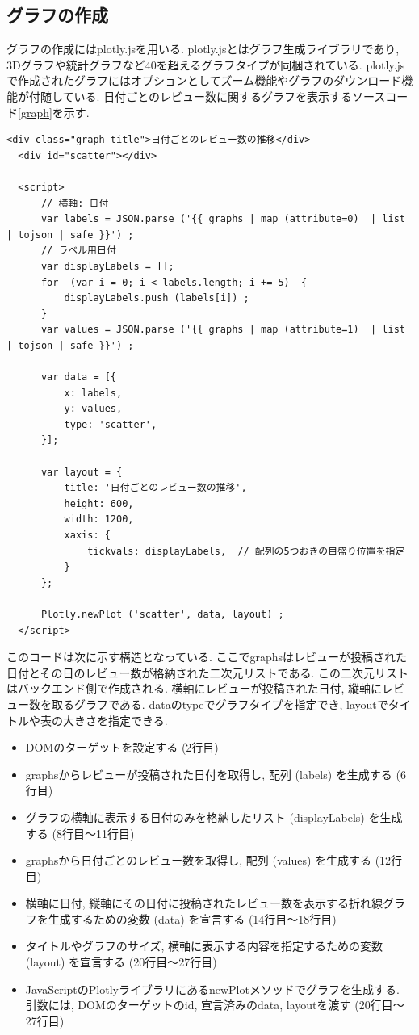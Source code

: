\subsection{グラフの作成}
グラフの作成にはplotly.jsを用いる. plotly.jsとはグラフ生成ライブラリであり, 3Dグラフや統計グラフなど40を超えるグラフタイプが同梱されている\cite{plotly}.
plotly.jsで作成されたグラフにはオプションとしてズーム機能やグラフのダウンロード機能が付随している. 
日付ごとのレビュー数に関するグラフを表示するソースコード\ref{graph}を示す. 

\begin{lstlisting}[caption=detail.html, label=graph]
  <div class="graph-title">日付ごとのレビュー数の推移</div>
  <div id="scatter"></div>

  <script>
      // 横軸: 日付
      var labels = JSON.parse ('{{ graphs | map (attribute=0)  | list | tojson | safe }}') ;
      // ラベル用日付
      var displayLabels = [];
      for  (var i = 0; i < labels.length; i += 5)  {
          displayLabels.push (labels[i]) ;
      }
      var values = JSON.parse ('{{ graphs | map (attribute=1)  | list | tojson | safe }}') ;

      var data = [{
          x: labels,
          y: values,
          type: 'scatter',
      }];

      var layout = {
          title: '日付ごとのレビュー数の推移',
          height: 600,
          width: 1200,
          xaxis: {
              tickvals: displayLabels,  // 配列の5つおきの目盛り位置を指定
          }
      };

      Plotly.newPlot ('scatter', data, layout) ;
  </script>
\end{lstlisting}

このコードは次に示す構造となっている. 
ここでgraphsはレビューが投稿された日付とその日のレビュー数が格納された二次元リストである. この二次元リストはバックエンド側で作成される. 
横軸にレビューが投稿された日付, 縦軸にレビュー数を取るグラフである. 
dataのtypeでグラフタイプを指定でき, layoutでタイトルや表の大きさを指定できる. 

\begin{itemize}
  \item DOMのターゲットを設定する (2行目)
  \item graphsからレビューが投稿された日付を取得し, 配列 (labels) を生成する (6行目)
  \item グラフの横軸に表示する日付のみを格納したリスト (displayLabels) を生成する (8行目〜11行目)
  \item graphsから日付ごとのレビュー数を取得し, 配列 (values) を生成する (12行目)
  \item 横軸に日付, 縦軸にその日付に投稿されたレビュー数を表示する折れ線グラフを生成するための変数 (data) を宣言する (14行目〜18行目)
  \item タイトルやグラフのサイズ, 横軸に表示する内容を指定するための変数 (layout) を宣言する (20行目〜27行目)
  \item JavaScriptのPlotlyライブラリにあるnewPlotメソッドでグラフを生成する. 引数には, DOMのターゲットのid, 宣言済みのdata, layoutを渡す (20行目〜27行目)
\end{itemize}


